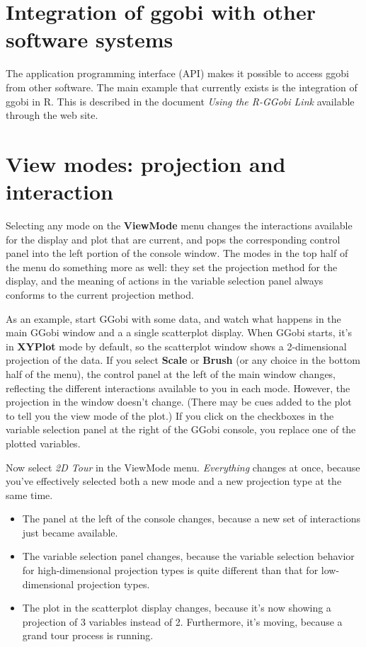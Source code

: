 \documentclass[11pt]{article}
\begin{document}
\section{Integration of ggobi with other software systems}
\label{slbl:Integration}

The application programming interface (API) makes it possible to
access ggobi from other software. The main example that currently
exists is the integration of ggobi in R. This is described in the
document {\em Using the R-GGobi Link} available through the web site.

\section{View modes: projection and interaction}
\label{slbl:ViewModes}

Selecting any mode on the {\bf ViewMode} menu changes the interactions
available for the display and plot that are current, and pops the
corresponding control panel into the left portion of the console
window.  The modes in the top half of the menu do something more as
well:  they set the projection method for the display, and the meaning
of actions in the variable selection panel always conforms to the current
projection method.

As an example, start GGobi with some data, and watch what happens in
the main GGobi window and a a single scatterplot display.   When
GGobi starts, it's in {\bf XYPlot} mode by default, so the
scatterplot window shows a 2-dimensional projection of the data.  If
you select {\bf Scale} or {\bf Brush} (or any choice in the bottom
half of the menu), the control panel at the left of the main window
changes, reflecting the different interactions available to you in
each mode.  However, the projection in the window doesn't change.
(There may be cues added to the plot to tell you the view mode of the
plot.) If you click on the checkboxes in the variable selection panel
at the right of the GGobi console, you replace one of the plotted
variables.

Now select {\em 2D Tour} in the ViewMode menu.  {\em Everything}
changes at once, because you've effectively selected both a new mode and
a new projection type at the same time.
\begin{itemize}
\itemsep 0em
\item The panel at the left of the console changes, because a
      new set of interactions just became available.
\item The variable selection panel changes, because the variable
      selection behavior for high-dimensional projection types is
      quite different than that for low-dimensional projection types.
\item The plot in the scatterplot display changes, because it's
      now showing a projection of 3 variables instead of 2.  Furthermore,
      it's moving, because a grand tour process is running.
\end{itemize}
\end{document}
